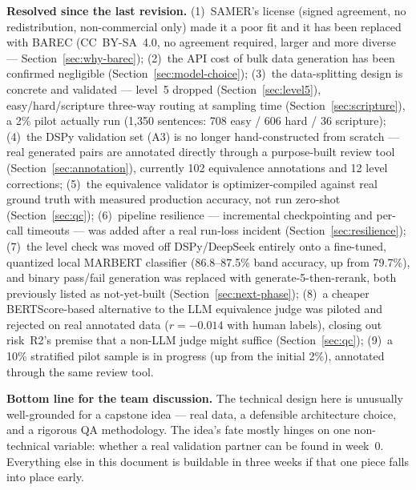 \documentclass[11pt,a4paper]{article}
\begin{document}
\begin{noteb}
\textbf{Resolved since the last revision.} (1)~SAMER's license (signed
agreement, no redistribution, non-commercial only) made it a poor fit and
it has been replaced with BAREC (CC~BY-SA~4.0, no agreement required,
larger and more diverse --- Section~\ref{sec:why-barec}); (2)~the API cost
of bulk data generation has been confirmed negligible
(Section~\ref{sec:model-choice}); (3)~the data-splitting design is
concrete and validated --- level~5 dropped (Section~\ref{sec:level5}),
easy/hard/scripture three-way routing at sampling time
(Section~\ref{sec:scripture}), a 2\% pilot actually run (1,350 sentences:
708 easy / 606 hard / 36 scripture); (4)~the DSPy validation set (A3) is
no longer hand-constructed from scratch --- real generated pairs are
annotated directly through a purpose-built review tool
(Section~\ref{sec:annotation}), currently 102 equivalence annotations and
12 level corrections; (5)~the equivalence validator is optimizer-compiled
against real ground truth with measured production accuracy, not run
zero-shot (Section~\ref{sec:qc}); (6)~pipeline resilience --- incremental
checkpointing and per-call timeouts --- was added after a real run-loss
incident (Section~\ref{sec:resilience}); (7)~the level check was moved off
DSPy/DeepSeek entirely onto a fine-tuned, quantized local MARBERT
classifier (86.8--87.5\% band accuracy, up from 79.7\%), and binary
pass/fail generation was replaced with generate-5-then-rerank, both
previously listed as not-yet-built (Section~\ref{sec:next-phase}); (8)~a
cheaper BERTScore-based alternative to the LLM equivalence judge was
piloted and rejected on real annotated data ($r=-0.014$ with human
labels), closing out risk~R2's premise that a non-LLM judge might suffice
(Section~\ref{sec:qc}); (9)~a 10\% stratified pilot sample is in progress
(up from the initial 2\%), annotated through the same review tool.
\end{noteb}

\vspace{0.4cm}
\begin{noteb}
\textbf{Bottom line for the team discussion.} The technical design here is
unusually well-grounded for a capstone idea --- real data, a defensible
architecture choice, and a rigorous QA methodology. The idea's fate mostly hinges
on one non-technical variable: whether a real validation partner can be found in
week~0. Everything else in this document is buildable in three weeks if that one
piece falls into place early.
\end{noteb}
\end{document}
